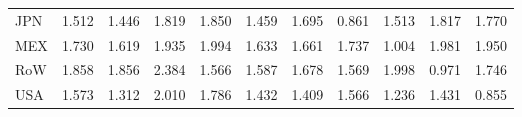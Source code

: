 \begin{table}[htbp]
\begin{tabular}{lcccccccccc}
  JPN & \textcolor[RGB]{186,120,69}{1.512} & \textcolor[RGB]{204,132,51}{1.446} & \textcolor[RGB]{84,54,171}{1.819} & \textcolor[RGB]{77,50,178}{1.850} & \textcolor[RGB]{201,130,54}{1.459} & \textcolor[RGB]{130,84,125}{1.695} & \textcolor[RGB]{250,162,5}{0.861} & \textcolor[RGB]{184,119,71}{1.513} & \textcolor[RGB]{87,56,168}{1.817} & \textcolor[RGB]{105,68,150}{1.770} \\ 
  MEX & \textcolor[RGB]{120,78,135}{1.730} & \textcolor[RGB]{156,101,99}{1.619} & \textcolor[RGB]{56,36,199}{1.935} & \textcolor[RGB]{43,28,212}{1.994} & \textcolor[RGB]{148,96,107}{1.633} & \textcolor[RGB]{140,91,115}{1.661} & \textcolor[RGB]{115,74,140}{1.737} & \textcolor[RGB]{235,152,20}{1.004} & \textcolor[RGB]{46,30,209}{1.981} & \textcolor[RGB]{54,35,201}{1.950} \\ 
  RoW & \textcolor[RGB]{69,45,186}{1.858} & \textcolor[RGB]{71,46,184}{1.856} & \textcolor[RGB]{5,3,250}{2.384} & \textcolor[RGB]{173,112,82}{1.566} & \textcolor[RGB]{158,102,97}{1.587} & \textcolor[RGB]{138,89,117}{1.678} & \textcolor[RGB]{168,109,87}{1.569} & \textcolor[RGB]{41,26,214}{1.998} & \textcolor[RGB]{237,153,18}{0.971} & \textcolor[RGB]{112,73,143}{1.746} \\ 
  USA & \textcolor[RGB]{166,107,89}{1.573} & \textcolor[RGB]{222,144,33}{1.312} & \textcolor[RGB]{38,25,217}{2.010} & \textcolor[RGB]{99,64,156}{1.786} & \textcolor[RGB]{212,137,43}{1.432} & \textcolor[RGB]{217,140,38}{1.409} & \textcolor[RGB]{171,111,84}{1.566} & \textcolor[RGB]{227,147,28}{1.236} & \textcolor[RGB]{214,139,41}{1.431} & \textcolor[RGB]{252,163,3}{0.855} \\ 
   \hline
\end{tabular}
\end{table}
